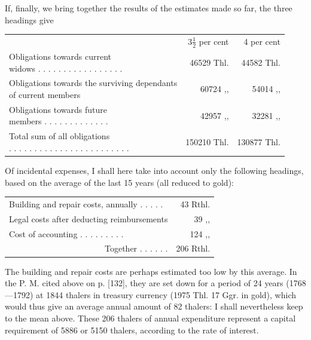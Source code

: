 If, finally, we bring together the results of the estimates made so far, the three headings give
\begin{center}
\footnotesize\setlength{\tabcolsep}{3pt}
\begin{tabular}{l r|r}
&\(3\tfrac{1}{2}\) per cent&4 per cent\\
\shortstack[l]{Obligations towards current\\widows . . . . . . . . . . . . . . . . .}&46529 Thl.&44582 Thl.\\
\shortstack[l]{Obligations towards the surviving dependants\\of current members}&60724 ,, &54014 ,, \\
\shortstack[l]{Obligations towards future\\members . . . . . . . . . . . . .}&42957 ,, &32281 ,, \\\cline{2-3}
\shortstack[l]{Total sum of all obligations\\ . . . . . . . . . . . . . . . . . . . . . . . .}&150210 Thl.&130877 Thl.
\end{tabular}
\end{center}
\noindent\hspace*{\parindent}Of incidental expenses, I shall here take into account only the following headings, based on the average of the last 15 years (all reduced to gold):
\begin{center}
\small\setlength{\tabcolsep}{3pt}
\begin{tabular}{l r}
Building and repair costs, annually . . . . .&43 Rthl.\\
Legal costs after deducting reimbursements&39 ,, \\
Cost of accounting . . . . . . . . .&124 ,, \\\cline{2-2}
\multicolumn{1}{r}{Together . . . . . .}&206 Rthl.
\end{tabular}
\end{center}
\noindent\hspace*{\parindent}The building and repair costs are perhaps estimated too low by this average. In the P. M. cited above on p. [132], they are set down for a period of 24 years (1768—1792) at 1844 thalers in treasury currency (1975 Thl. 17 Ggr. in gold), which would thus give an average annual amount of 82 thalers: I shall nevertheless keep to the mean above. These 206 thalers of annual expenditure represent a capital requirement of 5886 or 5150 thalers, according to the rate of interest.

